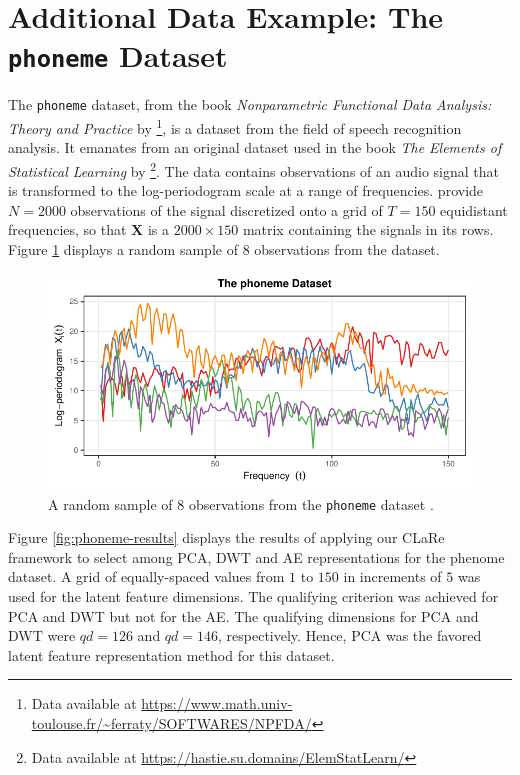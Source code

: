 \section{Additional Data Example: The \texttt{phoneme} Dataset}\label{sec:additional-data}

The \texttt{phoneme} dataset, from the book \emph{Nonparametric Functional Data Analysis: Theory and Practice} by \textcite{ferraty_nonparametric_2006}\footnote{Data available at \url{https://www.math.univ-toulouse.fr/~ferraty/SOFTWARES/NPFDA/}}, is a dataset from the field of speech recognition analysis.
It emanates from an original dataset used in the book \emph{The Elements of Statistical Learning} by \textcite{hastie_elements_2009}\footnote{Data available at \url{https://hastie.su.domains/ElemStatLearn/}}.
The data contains observations of an audio signal that is transformed to the log-periodogram scale at a range of frequencies.
\textcite{ferraty_nonparametric_2006} provide $N=2000$ observations of the signal discretized onto a grid of $T=150$ equidistant frequencies, so that $\mathbf{X}$ is a $2000\times 150$ matrix containing the signals in its rows.
Figure \ref{fig:phoneme} displays a random sample of $8$ observations from the dataset.

\begin{figure}[h]
    \centering
    \includegraphics[width=0.75\linewidth]{figures/phoneme.pdf}
    \caption{A random sample of $8$ observations from the \texttt{phoneme} dataset \parencite{hastie_elements_2009, ferraty_nonparametric_2006}.}
    \label{fig:phoneme}
\end{figure}

Figure \ref{fig:phoneme-results} displays the results of applying our CLaRe framework to select among PCA, DWT and AE representations for the phenome dataset. A grid of equally-spaced values from $1$ to $150$ in increments of $5$ was used for the latent feature dimensions.
The qualifying criterion was achieved for PCA and DWT but not for the AE. The qualifying dimensions for PCA and DWT were $qd=126$ and $qd = 146$, respectively. Hence, PCA was the favored latent feature representation method for this dataset.

